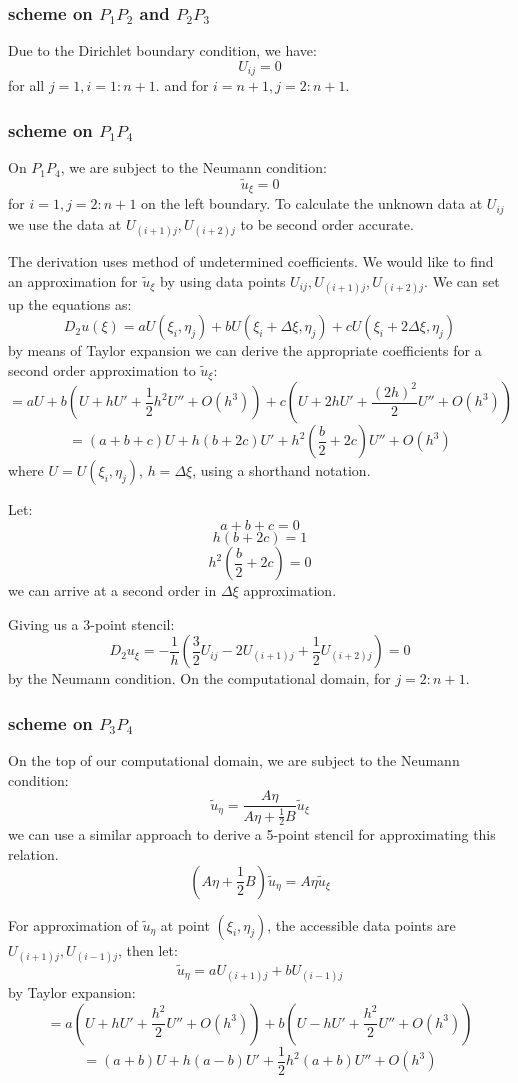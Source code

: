 \documentclass[12pt]{article}
\begin{document}
\subsubsection{scheme on $P_1P_2$ and $P_2P_3$}

Due to the Dirichlet boundary condition, we have:
$$
	U_{ij} = 0
$$ for all $j=1, i=1:n+1$. and for $i = n+1, j=2:n+1$.

\subsubsection{scheme on $P_1P_4$}\label{section:3pntstencil}
On $P_1P_4$, we are subject to the Neumann condition:
$$
	\tilde{u}_{\xi} = 0
$$ for $i = 1, j=2:n+1$ on the left boundary.
To calculate the unknown data at $U_{ij}$ we use the data at $U_{(i+1)j}, U_{(i+2)j}$ to be second order accurate.

The derivation uses method of undetermined coefficients. We would like to find an approximation for $\tilde{u}_{\xi}$ by using data points $U_{ij},U_{(i+1)j},U_{(i+2)j}$. We can set up the equations as:
$$
	D_2u({\xi}) = a U(\xi_i, \eta_j) + bU(\xi_i+\Delta \xi,\eta_{j})+ cU(\xi_i+2\Delta\xi,\eta_{j})
$$ by means of Taylor expansion we can derive the appropriate coefficients for a second order approximation to $\tilde{u}_{\xi}$:
$$
	= aU + b(U + h U' + \frac12 h^2 U'' + O(h^3)) + c(U + 2hU' + \frac{(2h)^2}{2}U'' + O(h^3))
$$ 
$$
	= (a+b+c)U + h(b+2c)U' + h^2(\frac{b}{2}+2c)U'' + O(h^3)
$$ where $U = U(\xi_{i},\eta_{j})$, $h = \Delta\xi$, using a shorthand notation.

Let:
$$
	a+b+c = 0
$$
$$
	h(b+2c) = 1
$$
$$
	h^2(\frac{b}{2}+2c) = 0
$$ we can arrive at a second order in $\Delta \xi$ approximation.

Giving us a 3-point stencil:
$$
	D_2u_{\xi} = -\frac{1}{h}(\frac32 U_{ij} - 2U_{(i+1)j} + \frac12 U_{(i+2)j}) = 0
$$ by the Neumann condition. On the computational domain, for $j = 2:n+1$.
\subsubsection{scheme on $P_3P_4$}

On the top of our computational domain, we are subject to the Neumann condition:
$$
	\tilde{u}_{\eta} = \frac{A\eta}{A\eta+\frac{1}{2}B}\tilde{u}	_{\xi}
$$ we can use a similar approach to derive a 5-point stencil for approximating this relation.
$$
	(A\eta+\frac12 B)\tilde{u}_{\eta} = A\eta \tilde{u}_{\xi}
$$

For approximation of $\tilde{u}_{\eta}$ at point $(\xi_{i}, \eta_{j})$, the accessible data points are $U_{(i+1)j},U_{(i-1)j}$, then let:
$$
	\tilde{u}_{\eta} = aU_{(i+1)j} + bU_{(i-1)j}
$$ by Taylor expansion:
$$
	= a(U+hU'+\frac{h^2}{2}U''+O(h^3)) + b(U-hU'+\frac{h^2}{2}U''+O(h^3))
$$
$$
	= (a+b)U + h(a-b)U' + \frac{1}{2}h^2 (a+b) U'' + O(h^3)
$$
\end{document}
